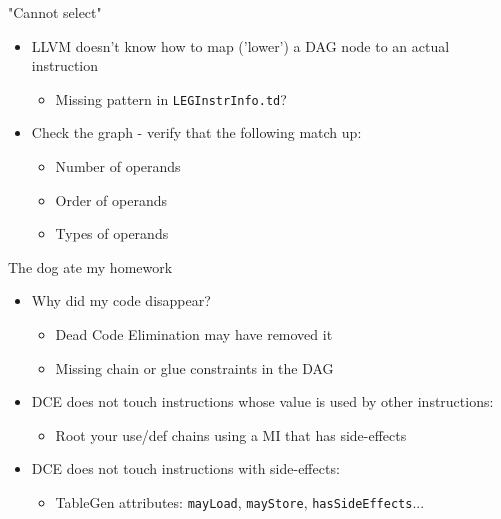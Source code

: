 
\begin{frame}{"Cannot select"}

\begin{itemize}
    \item LLVM doesn't know how to map ('lower') a DAG node to an actual instruction
    \begin{itemize}
        \item Missing pattern in \texttt{LEGInstrInfo.td}?
    \end{itemize}
    \item Check the graph - verify that the following match up:
    \begin{itemize}
        \item Number of operands
        \item Order of operands
        \item Types of operands
    \end{itemize}
\end{itemize}

\end{frame}


\begin{frame}{The dog ate my homework}

\begin{itemize}
    \item Why did my code disappear?
    \begin{itemize}
        \item Dead Code Elimination may have removed it
        \item Missing chain or glue constraints in the DAG
    \end{itemize}
    \item DCE does not touch instructions whose value is used by other instructions:
    \begin{itemize}
        \item Root your use/def chains using a MI that has side-effects
    \end{itemize}
    \item DCE does not touch instructions with side-effects:
    \begin{itemize}
        \item TableGen attributes: \texttt{mayLoad}, \texttt{mayStore}, \texttt{hasSideEffects}...
    \end{itemize}
\end{itemize}

\end{frame}

